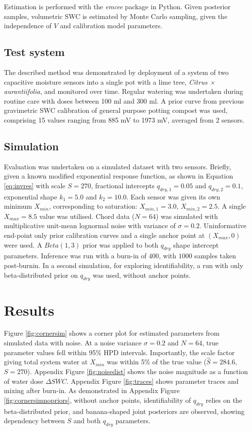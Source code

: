 \documentclass[11pt]{article}
\begin{document}
Estimation is performed with the \textit{emcee} \cite{foreman2013emcee} package in Python. Given posterior samples, volumetric SWC is estimated by Monte Carlo sampling, given the independence of $V$ and calibration model parameters. 

\subsection{Test system}

The described method was demonstrated by deployment of a system of two capacitive moisture sensors into a single pot with a lime tree, \textit{Citrus × aurantiifolia},
and monitored over time. Regular watering was undertaken during routine care with doses between 100 ml and 300 ml. A prior curve from previous gravimetric SWC calibration
of general purpose potting compost was used, comprising 15 values ranging from 885 mV to 1973 mV, averaged from 2 sensors.

\subsection{Simulation}

Evaluation was undertaken on a simulated dataset with two sensors. Briefly, given a known modified exponential 
response function, as shown in Equation \eqref{eq:invres} with scale $S=270$, 
fractional intercepts $q_{dry,1} = 0.05$ and $q_{dry,2} = 0.1$,
exponential shape $k_1 = 5.0$ and $k_2 = 10.0$.
Each sensor was given its own minimum $X_{min}$, corresponding to saturation: $X_{min,1} = 3.0$, $X_{min,2} = 2.5$.
A single $X_{max} = 8.5$ value was utilised. 
Chord data ($N=64$) was simulated with multiplicative unit-mean lognormal noise 
with variance of $\sigma = 0.2$. Uninformative end-point only prior calibration curves and a single anchor point at $(X_{max}, 0)$
were used.
A $Beta(1,3)$ prior was applied to both $q_{dry}$ shape intercept parameters.
Inference was run with a burn-in of $400$, with $1000$ samples taken post-burnin.
In a second simulation, for exploring identifiability, a run with only beta-distributed prior on $q_{dry}$ was used, without
anchor points.

\section{Results}

Figure \ref{fig:cornersim} shows a corner plot for estimated parameters from simulated data with noise.
At a noise variance $\sigma = 0.2$ and $N=64$, true parameter values fell within 95\% HPD intervals. Importantly, the scale
factor giving total system water at $X_{min}$ was within 5\% of the true value ($\hat{S} = 284.6$, $S=270$). 
Appendix Figure \ref{fig:noisedist} shows the noise magnitude as a function of water dose $\Delta SWC$.
Appendix Figure \ref{fig:traces} shows parameter traces and mixing after burn-in.
As demonstrated in Appendix Figure \ref{fig:cornersimnopriors}, without anchor points, identifiability of $q_{dry}$ relies
on the beta-distributed prior, and banana-shaped joint posteriors are observed, showing dependency between $S$ and both $q_{dry}$ parameters.
\end{document}
